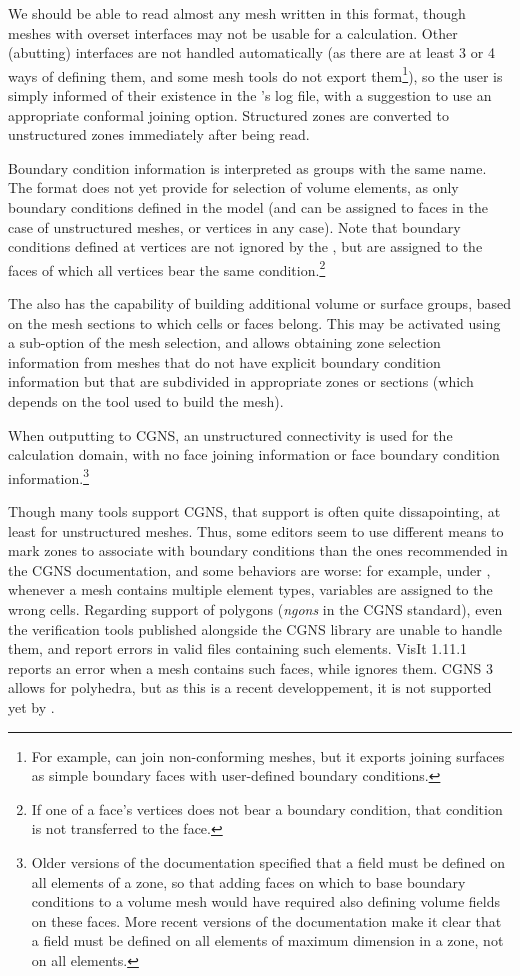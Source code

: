 {{{We should be able to read almost any mesh written in this format, though
meshes with overset interfaces may not be usable for a calculation.
Other (abutting) interfaces are not handled automatically (as there are
at least 3 or 4 ways of defining them, and some mesh tools do not export
them\footnote{For example, \icemcfd can join non-conforming meshes, but it
exports joining surfaces as simple boundary faces with user-defined boundary
conditions.}), so the user is simply informed of their existence in the
\pcs's log file, with a suggestion to use an appropriate conformal joining
option. Structured zones are converted to unstructured zones immediately after
being read.

Boundary condition information is interpreted as groups with the same
name. The format does not yet provide for selection of volume elements,
as only boundary conditions defined in the model (and can be assigned to
faces in the case of unstructured meshes, or vertices in any case).
Note that boundary conditions defined at vertices are not ignored by
the \pcs, but are assigned to the faces of which all vertices bear
the same condition.\footnote{If one of a face's vertices does not bear
a boundary condition, that condition is not transferred to the face.}

The \pcs also has the capability of building additional volume or surface groups,
based on the mesh sections to which cells or faces belong. This may be
activated using a sub-option of the mesh selection, and allows obtaining
zone selection information from meshes that do not have explicit
boundary condition information but that are subdivided in appropriate zones or
sections (which depends on the tool used to build the mesh).

When outputting to CGNS, an unstructured connectivity is used for the calculation
domain, with no face joining information or face boundary condition
information.\footnote{Older versions of the documentation specified that
a field must be defined on all elements of a zone, so that adding faces
on which to base boundary conditions to a volume mesh would have required
also defining volume fields on these faces. More recent versions of the
documentation make it clear that a field must be defined on all elements
of maximum dimension in a zone, not on all elements.} 

Though many tools support CGNS, that support is often quite dissapointing,
at least for unstructured meshes. Thus, some editors seem to use
different means to mark zones to associate with boundary conditions than
the ones recommended in the CGNS documentation, and some behaviors
are worse: for example, under , whenever a mesh
contains multiple element types, variables are assigned to the wrong cells.
Regarding support of polygons (\emph{ngons} in the CGNS standard), even the
verification tools published alongside the CGNS library are unable
to handle them, and report errors in valid files containing such elements.
VisIt 1.11.1 reports an error when a mesh contains such faces, while
 ignores them. CGNS 3 allows for polyhedra, but as this is a
recent developpement, it is not supported yet by \CS.

}}}

